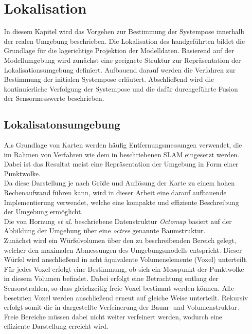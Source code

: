 \chapter{Lokalisation}
\label{chap.loc}

In diesem Kapitel wird das Vorgehen zur Bestimmung der Systempose innerhalb der realen Umgebung beschrieben. Die Lokalisation des handgeführten  bildet die Grundlage für die lagerichtige Projektion der Modelldaten. Basierend auf der Modellumgebung wird zunächst eine geeignete Struktur zur Repräsentation der Lokalisationsumgebung definiert. Aufbauend darauf werden die Verfahren zur Bestimmung der initialen Systempose erläutert. Abschließend wird die kontinuierliche Verfolgung der Systempose und die dafür durchgeführte Fusion der Sensormesswerte beschrieben.

\section{Lokalisatonsumgebung}
\label{chap.map}
Als Grundlage von Karten werden häufig Entfernungsmessungen verwendet, die im Rahmen von Verfahren wie dem in  beschriebenen SLAM eingesetzt werden. Dabei ist das Resultat meist eine Repräsentation der Umgebung in Form einer Punktwolke.\\
Da diese Darstellung je nach Größe und Auflösung der Karte zu einem hohen Rechenaufwand führen kann, wird in dieser Arbeit eine darauf aufbauende Implementierung \cite{Octomap} verwendet, welche eine kompakte und effiziente Beschreibung der Umgebung ermöglicht.\\

Die von Hornung \textit{et al.} \cite{Hornung2013} beschriebene Datenstruktur \textit{Octomap} basiert auf der Abbildung der Umgebung über eine \textit{octree} genannte Baumstruktur.\\
Zunächst wird ein Würfelvolumen über den zu beschreibenden Bereich gelegt, welcher den maximalen Abmessungen des Umgebungsmodells entspricht. Dieser Würfel wird anschließend in acht äquivalente Volumenelemente (Voxel) unterteilt. Für jedes Voxel erfolgt eine Bestimmung, ob sich ein Messpunkt der Punktwolke in diesem Volumen befindet. Dabei erfolgt eine Betrachtung entlang der Sensorstrahlen, so dass gleichzeitig freie Voxel bestimmt werden können. Alle besetzten Voxel werden anschließend erneut auf gleiche Weise unterteilt. Rekursiv erfolgt somit die in  dargestellte Verfeinerung der Baum- und Volumenstruktur. Freie Bereiche müssen dabei nicht weiter verfeinert werden, wodurch eine effiziente Darstellung erreicht wird.\\

